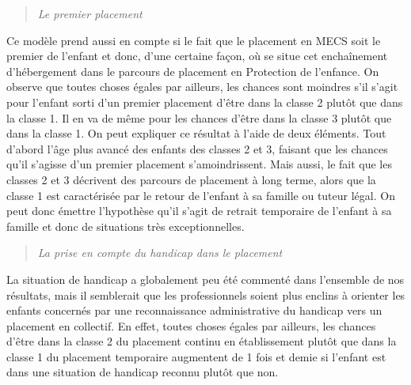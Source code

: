 \documentclass[
  12,
  a4paper,
]{report}
\begin{document}
\begin{quote}
\emph{Le premier placement}
\end{quote}

Ce modèle prend aussi en compte si le fait que le placement en MECS soit
le premier de l'enfant et donc, d'une certaine façon, où se situe cet
enchaînement d'hébergement dans le parcours de placement en Protection
de l'enfance. On observe que toutes choses égales par ailleurs, les
chances sont moindres s'il s'agit pour l'enfant sorti d'un premier
placement d'être dans la classe 2 plutôt que dans la classe 1. Il en va
de même pour les chances d'être dans la classe 3 plutôt que dans la
classe 1. On peut expliquer ce résultat à l'aide de deux éléments. Tout
d'abord l'âge plus avancé des enfants des classes 2 et 3, faisant que
les chances qu'il s'agisse d'un premier placement s'amoindrissent. Mais
aussi, le fait que les classes 2 et 3 décrivent des parcours de
placement à long terme, alors que la classe 1 est caractérisée par le
retour de l'enfant à sa famille ou tuteur légal. On peut donc émettre
l'hypothèse qu'il s'agit de retrait temporaire de l'enfant à sa famille
et donc de situations très exceptionnelles.

\begin{quote}
\emph{La prise en compte du handicap dans le placement}
\end{quote}

La situation de handicap a globalement peu été commenté dans l'ensemble
de nos résultats, mais il semblerait que les professionnels soient plus
enclins à orienter les enfants concernés par une reconnaissance
administrative du handicap vers un placement en collectif. En effet,
toutes choses égales par ailleurs, les chances d'être dans la classe 2
du placement continu en établissement plutôt que dans la classe 1 du
placement temporaire augmentent de 1 fois et demie si l'enfant est dans
une situation de handicap reconnu plutôt que non.
\end{document}
